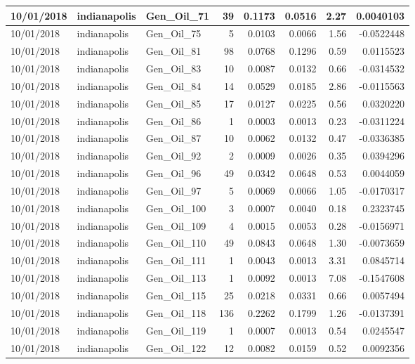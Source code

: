 \documentclass[
  letterpaper,
  DIV=11,
  numbers=noendperiod]{scrartcl}
\begin{document}
\begin{tabular}{l|l|l|r|r|r|r|r}
\hline
10/01/2018 & indianapolis & Gen\_Oil\_71 & 39 & 0.1173 & 0.0516 & 2.27 & 0.0040103\\
\hline
10/01/2018 & indianapolis & Gen\_Oil\_75 & 5 & 0.0103 & 0.0066 & 1.56 & -0.0522448\\
\hline
10/01/2018 & indianapolis & Gen\_Oil\_81 & 98 & 0.0768 & 0.1296 & 0.59 & 0.0115523\\
\hline
10/01/2018 & indianapolis & Gen\_Oil\_83 & 10 & 0.0087 & 0.0132 & 0.66 & -0.0314532\\
\hline
10/01/2018 & indianapolis & Gen\_Oil\_84 & 14 & 0.0529 & 0.0185 & 2.86 & -0.0115563\\
\hline
10/01/2018 & indianapolis & Gen\_Oil\_85 & 17 & 0.0127 & 0.0225 & 0.56 & 0.0320220\\
\hline
10/01/2018 & indianapolis & Gen\_Oil\_86 & 1 & 0.0003 & 0.0013 & 0.23 & -0.0311224\\
\hline
10/01/2018 & indianapolis & Gen\_Oil\_87 & 10 & 0.0062 & 0.0132 & 0.47 & -0.0336385\\
\hline
10/01/2018 & indianapolis & Gen\_Oil\_92 & 2 & 0.0009 & 0.0026 & 0.35 & 0.0394296\\
\hline
10/01/2018 & indianapolis & Gen\_Oil\_96 & 49 & 0.0342 & 0.0648 & 0.53 & 0.0044059\\
\hline
10/01/2018 & indianapolis & Gen\_Oil\_97 & 5 & 0.0069 & 0.0066 & 1.05 & -0.0170317\\
\hline
10/01/2018 & indianapolis & Gen\_Oil\_100 & 3 & 0.0007 & 0.0040 & 0.18 & 0.2323745\\
\hline
10/01/2018 & indianapolis & Gen\_Oil\_109 & 4 & 0.0015 & 0.0053 & 0.28 & -0.0156971\\
\hline
10/01/2018 & indianapolis & Gen\_Oil\_110 & 49 & 0.0843 & 0.0648 & 1.30 & -0.0073659\\
\hline
10/01/2018 & indianapolis & Gen\_Oil\_111 & 1 & 0.0043 & 0.0013 & 3.31 & 0.0845714\\
\hline
10/01/2018 & indianapolis & Gen\_Oil\_113 & 1 & 0.0092 & 0.0013 & 7.08 & -0.1547608\\
\hline
10/01/2018 & indianapolis & Gen\_Oil\_115 & 25 & 0.0218 & 0.0331 & 0.66 & 0.0057494\\
\hline
10/01/2018 & indianapolis & Gen\_Oil\_118 & 136 & 0.2262 & 0.1799 & 1.26 & -0.0137391\\
\hline
10/01/2018 & indianapolis & Gen\_Oil\_119 & 1 & 0.0007 & 0.0013 & 0.54 & 0.0245547\\
\hline
10/01/2018 & indianapolis & Gen\_Oil\_122 & 12 & 0.0082 & 0.0159 & 0.52 & 0.0092356\\

\end{tabular}
\end{document}
